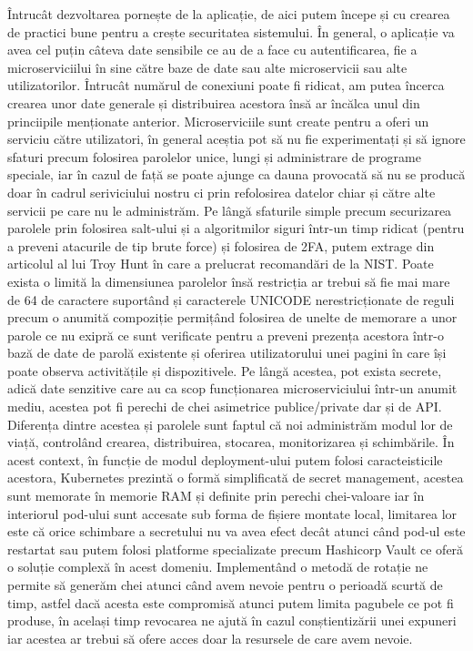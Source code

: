 Întrucât dezvoltarea pornește de la aplicație, de aici putem începe și cu crearea de
practici bune pentru a crește securitatea sistemului. În general, o aplicație va avea
cel puțin câteva date sensibile ce au de a face cu autentificarea, fie a microserviciilui în sine
către baze de date sau alte microservicii sau alte utilizatorilor. Întrucât numărul de conexiuni
poate fi ridicat, am putea încerca crearea unor date generale și distribuirea acestora însă ar
încălca unul din princiipile menționate anterior. Microserviciile sunt create pentru a oferi
un serviciu către utilizatori, în general aceștia pot să nu fie experimentați și să ignore
sfaturi precum folosirea parolelor unice, lungi și administrare de programe speciale, iar
în cazul de față se poate ajunge ca dauna provocată să nu se producă doar în cadrul
seriviciului nostru ci prin refolosirea datelor chiar și către alte servicii pe care nu le administrăm.
Pe lângă sfaturile simple precum securizarea parolele prin folosirea salt-ului și a algoritmilor
siguri într-un timp ridicat (pentru a preveni atacurile de tip brute force) și folosirea de 2FA, putem extrage
din articolul \cite{troy_hunt2017} al lui Troy Hunt în care a prelucrat recomandări de la NIST.
Poate exista o limită la dimensiunea parolelor însă restricția ar trebui să fie mai mare
de 64 de caractere suportând și caracterele UNICODE nerestricționate de reguli precum
o anumită compoziție permițând folosirea de unelte de memorare a unor parole ce nu exipră
ce sunt verificate pentru a preveni prezența acestora într-o bază de date de parolă existente
și oferirea utilizatorului unei pagini în care își poate observa activitățile și dispozitivele.
Pe lângă acestea, pot exista secrete, adică date senzitive care au ca scop funcționarea
microserviciului într-un anumit mediu, acestea pot fi perechi de chei asimetrice publice/private
dar și de API. Diferența dintre acestea și parolele sunt faptul că noi administrăm modul lor
de viață, controlând crearea, distribuirea, stocarea, monitorizarea și schimbările. În acest context,
în funcție de modul deployment-ului putem folosi caracteisticile acestora, Kubernetes prezintă
o formă simplificată de secret management, acestea sunt memorate în memorie RAM și definite prin
perechi chei-valoare iar în interiorul pod-ului sunt accesate sub forma de fișiere montate local,
limitarea lor este că orice schimbare a secretului nu va avea efect decât atunci când pod-ul este
restartat sau putem folosi platforme specializate precum Hashicorp Vault ce oferă o soluție
complexă în acest domeniu. Implementând o metodă de rotație ne permite să generăm chei atunci
când avem nevoie pentru o perioadă scurtă de timp, astfel dacă acesta este compromisă
atunci putem limita pagubele ce pot fi produse, în același timp revocarea ne ajută
în cazul conștientizării unei expuneri iar acestea ar trebui să ofere acces doar la
resursele de care avem nevoie.


